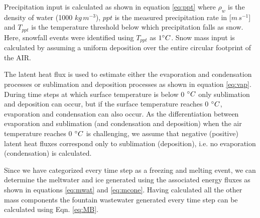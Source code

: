 \documentclass[utf8]{frontiersSCNS}
\begin{document}
Precipitation input is calculated as shown in equation \ref{eq:ppt} where $\rho_{w}$ is the density of water (1000
$kg\,m^{-3}$), $ppt$ is the measured precipitation rate in [$m\,s^{-1}$] and $T_{ppt}$ is the temperature threshold
below which precipitation falls as snow. Here, snowfall events were identified using $T_{ppt}$ as $1 \degree C$. Snow
mass input is calculated by assuming a uniform deposition over the entire circular footprint of the AIR.

The latent heat flux is used to estimate either the evaporation and condensation processes or sublimation and deposition
processes as shown in equation \ref{eq:vap}. During time steps at which surface temperature is below 0 $\degree C$ only
sublimation and deposition can occur, but if the surface temperature reaches 0 $\degree C$, evaporation and condensation
can also occur. As the differentiation between evaporation and sublimation (and condensation and deposition) when the
air temperature reaches 0 $\degree C$ is challenging, we assume that negative (positive) latent heat fluxes correspond
only to sublimation (deposition), i.e. no evaporation (condensation) is calculated.

Since we have categorized every time step as a freezing and melting event, we can determine the meltwater and  ice
generated using the associated energy fluxes as shown in equations \ref{eq:mwat} and \ref{eq:mcone}. Having calculated
all the other mass components the fountain wastewater generated every time step can be calculated using Eqn.
\ref{eq:MB}.
\end{document}
